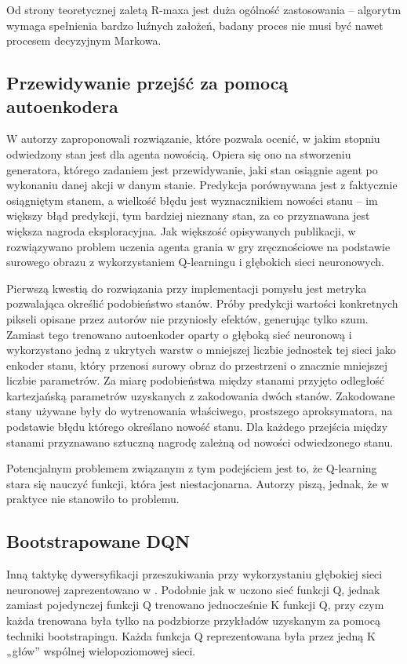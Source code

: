 Od strony teoretycznej zaletą R-maxa jest duża ogólność zastosowania – algorytm wymaga spełnienia bardzo luźnych założeń, badany proces nie musi być nawet procesem decyzyjnym Markowa.

\subsection{Przewidywanie przejść za pomocą autoenkodera}
W \cite{DBLP:journals/corr/StadieLA15} autorzy zaproponowali rozwiązanie, które pozwala ocenić, w jakim stopniu odwiedzony stan jest dla agenta nowością. Opiera się ono na stworzeniu generatora, którego zadaniem jest przewidywanie, jaki stan osiągnie agent po wykonaniu danej akcji w danym stanie. Predykcja porównywana jest z faktycznie osiągniętym stanem, a wielkość błędu jest wyznacznikiem nowości stanu – im większy błąd predykcji, tym bardziej nieznany stan, za co przyznawana jest większa nagroda eksploracyjna. Jak większość opisywanych publikacji, w \cite{DBLP:journals/corr/StadieLA15} rozwiązywano problem uczenia agenta grania w gry zręcznościowe na podstawie surowego obrazu z wykorzystaniem Q-learningu i głębokich sieci neuronowych.

Pierwszą kwestią do rozwiązania przy implementacji pomysłu jest metryka pozwalająca określić podobieństwo stanów. Próby predykcji wartości konkretnych pikseli opisane przez autorów nie przyniosły efektów, generując tylko szum. Zamiast tego trenowano autoenkoder oparty o głęboką sieć neuronową i wykorzystano jedną z ukrytych warstw o mniejszej liczbie jednostek tej sieci jako enkoder stanu, który przenosi surowy obraz do przestrzeni o znacznie mniejszej liczbie parametrów. Za miarę podobieństwa między stanami przyjęto odległość kartezjańską parametrów uzyskanych z zakodowania dwóch stanów. Zakodowane stany używane były do wytrenowania właściwego, prostszego aproksymatora, na podstawie błędu którego określano nowość stanu. Dla każdego przejścia między stanami przyznawano sztuczną nagrodę zależną od nowości odwiedzonego stanu.

Potencjalnym problemem związanym z tym podejściem jest to, że Q-learning stara się nauczyć funkcji, która jest niestacjonarna. Autorzy piszą, jednak, że w praktyce nie stanowiło to problemu.

\subsection{Bootstrapowane DQN}
Inną taktykę dywersyfikacji przeszukiwania przy wykorzystaniu głębokiej sieci neuronowej zaprezentowano w \cite{DBLP:journals/corr/OsbandBPR16}. Podobnie jak w \cite{DBLP:journals/corr/StadieLA15} uczono sieć funkcji Q, jednak zamiast pojedynczej funkcji Q trenowano jednocześnie K funkcji Q, przy czym każda trenowana była tylko na podzbiorze przykładów uzyskanym za pomocą techniki bootstrapingu. Każda funkcja Q reprezentowana była przez jedną K „głów” wspólnej wielopoziomowej sieci.

